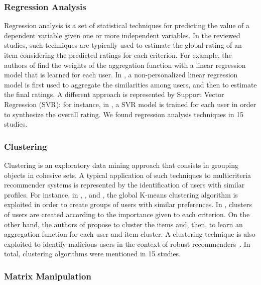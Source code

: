 \subsubsection{Regression Analysis}

Regression analysis is a set of statistical techniques for predicting the value of a dependent variable given one or more independent variables. In the reviewed studies, such techniques are typically used to estimate the global rating of an item considering the predicted ratings for each criterion. For example, the authors of  find the weights of the aggregation function with a linear regression model that is learned for each user. In , a non-personalized linear regression model is first used to aggregate the similarities among users, and then to estimate the final ratings. A different approach is represented by Support Vector Regression (SVR): for instance, in , a SVR model is trained for each user in order to synthesize the overall rating. We found regression analysis techniques in 15 studies.

\subsubsection{Clustering}

Clustering is an exploratory data mining approach that consists in grouping objects in cohesive sets. A typical application of such techniques to multicriteria recommender systems is represented by the identification of users with similar profiles. For instance, in , , and , the global K-means clustering algorithm is exploited in order to create groups of users with similar preferences. In , clusters of users are created according to the importance given to each criterion. On the other hand, the authors of  propose to cluster the items and, then, to learn an aggregation function for each user and item cluster. A clustering technique is also exploited to identify malicious users in the context of robust recommenders~. In total, clustering algorithms were mentioned in 15 studies.

\subsubsection{Matrix Manipulation}

